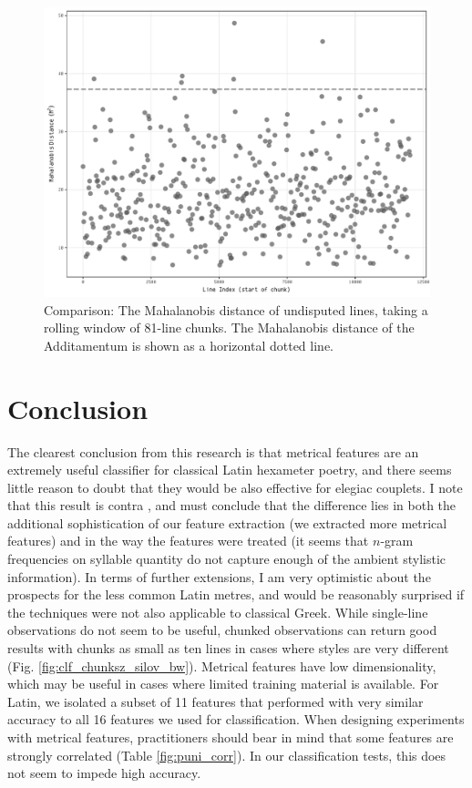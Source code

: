 \documentclass[11pt,a4paper]{scrartcl} %
\begin{document}
\begin{figure}[h]
    \caption{Comparison: The Mahalanobis distance of undisputed lines, taking a rolling window of 81-line chunks. The Mahalanobis distance of the Additamentum is shown as a horizontal dotted line.}
    \label{fig:rolling_weirdness}
    \includegraphics[width=\textwidth]{rolling_weirdness_bw.pdf}
\end{figure}

\section{Conclusion}
The clearest conclusion from this research is that metrical features are an extremely useful classifier for classical Latin hexameter poetry, and there seems little reason to doubt that they would be also effective for elegiac couplets. I note that this result is contra \citet[293]{forstall_evidence_2011}, and must conclude that the difference lies in both the additional sophistication of our feature extraction (we extracted more metrical features) and in the way the features were treated (it seems that $n$-gram frequencies on syllable quantity do not capture enough of the ambient stylistic information). In terms of further extensions, I am very optimistic about the prospects for the less common Latin metres, and would be reasonably surprised if the techniques were not also applicable to classical Greek. While single-line observations do not seem to be useful, chunked observations can return good results with chunks as small as ten lines in cases where styles are very different (Fig. \ref{fig:clf_chunksz_silov_bw}). Metrical features have low dimensionality, which may be useful in cases where limited training material is available. For Latin, we isolated a subset of 11 features that performed with very similar accuracy to all 16 features we used for classification. When designing experiments with metrical features, practitioners should bear in mind that some features are strongly correlated (Table \ref{fig:puni_corr}). In our classification tests, this does not seem to impede high accuracy.
\end{document}
